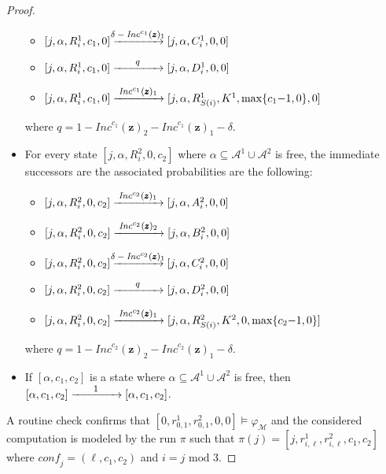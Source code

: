 \documentclass[a4paper,UKenglish,cleveref, autoref, thm-restate]{lipics-v2021}
\newcommand{\A}{\mathcal{A}}
\newcommand{\M}{\mathcal{M}}
\newcommand{\tran}[1]{\xrightarrow{\makebox[4em]{\footnotesize$#1$}}}
\newcommand{\INC}{\mathit{Inc}}
\renewcommand{\vec}[1]{\pmb{#1}}
\newcommand{\conf}{\textit{conf}}
\newcommand{\vv}[1]{\INC^{#1}(\vec{z})}
\begin{document}
\begin{proof}
\begin{itemize}
\begin{itemize}
        \item $[j,\alpha,R_i^1,c_1,0] \tran{\delta - \vv{c_1}_1}
               [j,\alpha,C_i^1,0,0]$        
        \item $[j,\alpha,R_i^1,c_1,0] \tran{q}
               [j,\alpha,D_i^1,0,0]$ 
        \item $[j,\alpha,R_i^1,c_1,0] \tran{\vv{c_1}_1}
               [j,\alpha,R_{S(i)}^1,K^1,\max\{c_1{-}1,0\},0]$ 
  \end{itemize}
  where $q = 1 - \vv{c_1}_2 - \vv{c_1}_1 - \delta$.
  \item For every state $[j,\alpha,R_i^2,0,c_2]$ where $\alpha \subseteq \A^1 \cup \A^2$ is free, the immediate successors are the associated probabilities are the following:
  \begin{itemize}
        \item $[j,\alpha,R_i^2,0,c_2] \tran{\vv{c_2}_1}
               [j,\alpha,A_i^2,0,0]$ 
        \item $[j,\alpha,R_i^2,0,c_2] \tran{\vv{c_2}_2}
               [j,\alpha,B_i^2,0,0]$ 
        \item $[j,\alpha,R_i^2,0,c_2] \tran{\delta - \vv{c_2}_1}
               [j,\alpha,C_i^2,0,0]$        
        \item $[j,\alpha,R_i^2,0,c_2] \tran{q}
               [j,\alpha,D_i^2,0,0]$ 
        \item $[j,\alpha,R_i^2,0,c_2] \tran{\vv{c_2}_1}
               [j,\alpha,R_{S(i)}^2,K^2,0,\max\{c_2{-}1,0\}]$ 
  \end{itemize}
  where $q = 1 - \vv{c_2}_2 - \vv{c_2}_1 - \delta$.
  \item If $[\alpha,c_1,c_2]$ is a state where $\alpha \subseteq \A^1 \cup \A^2$ is free, then $[\alpha,c_1,c_2] \tran{1} [\alpha,c_1,c_2]$.
\end{itemize}
A routine check confirms that $[0,r^1_{0,1},r^2_{0,1},0,0] \models \varphi_\M$ and the considered computation is modeled by the run $\pi$ such that
$\pi(j) = [j,r^1_{i,\ell},r^2_{i,\ell},c_1,c_2]$ where $\conf_j = (\ell,c_1,c_2)$ and $i = j \mbox{ mod } 3$.
\end{proof}
\end{document}
